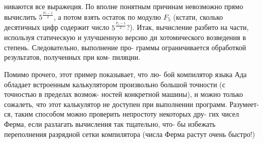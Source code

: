 ниваются  все  выражеция.  По  вполне  понятным  причинам  невозможно\linebreak
прямо  вычислить $5^{\frac{F_5-1}{2}}$,  а  потом  взять  остаток  по  модулю  $F_5$ (кстати,\linebreak
сколько  десятичных  цифр  содержит  число  $5^{\frac{F_5-1}{2}}$?).  Итак,  вычисление\linebreak
разбито  на  части,  используя  статическую  и  улучшенную  версию  ди\linebreak
хотомического  возведения  в  степень.  Следовательно,  выполнение  про-\linebreak
граммы ограничивается обработкой результатов, полученных при ком-\linebreak
пиляции.
\begin{mynotice}
Помимо прочего, этот пример показывает, что лю-\linebreak
бой компилятор языка Ада обладает встроенным калькулятором\linebreak
произвольно большой точности (с точностью в пределах возмож-\linebreak
ностей конкретной машины), и можно только сожалеть, что этот\linebreak
\newpage
\noindent
калькулятор  не  доступен  при  выполнении  программ.  Разумеет-\linebreak
ся, таким способом можно проверить непростоту некоторых дру-\linebreak
гих чисел Ферма, если разлагать вычисления так тщательно, что-\linebreak
бы избежать  переполнения  разрядной  сетки компилятора  (числа\linebreak
Ферма растут  очень  быстро!)
\end{mynotice}
